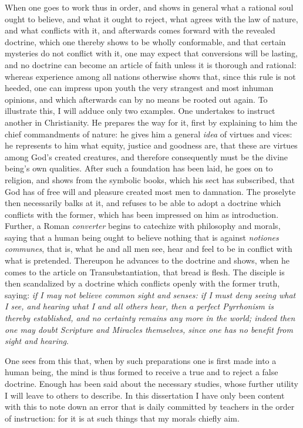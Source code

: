 \documentclass[12pt,a4paper,openany]{book}
\newcommand{\opage}[1]{\marginnote{\footnotesize\textit{[#1]}}}
\begin{document}
When one goes to work thus in order, and shows in general what a rational soul
ought to believe, and what it ought to reject, what agrees with the law of nature,
and what conflicts with it, and afterwards comes forward with the revealed
doctrine, which one thereby shows to be wholly conformable, and that certain
mysteries do not conflict with it, one may expect that conversions will be lasting,
and no doctrine can become an article of faith unless it is thorough and rational:
whereas experience among all nations otherwise shows that, since this rule is not
heeded, one can impress upon youth the very strangest and most inhuman opinions,
and which afterwards can by no means be rooted out again. To illustrate this, I
will adduce only two examples. One undertakes to instruct another in Christianity.
He prepares the way for it, first by explaining to him the chief commandments of
nature: he gives him a general \textit{idea} of virtues and vices: he represents to
him what equity, justice and goodness are, that these are virtues among God's
created creatures, and therefore consequently must be the divine being's own
qualities. After such a foundation has been laid, he goes on to religion, and
shows from the symbolic books, which his sect has subscribed, that God has
\setcounter{footnote}{0}%
\opage{20}of free will and pleasure created most men to damnation. The proselyte then
necessarily balks at it, and refuses to be able to adopt a doctrine which conflicts
with the former, which has been impressed on him as introduction. Further, a Roman
\textit{converter} begins to catechize with philosophy and morals, saying that a
human being ought to believe nothing that is against \textit{notiones communes},
that is, what he and all men see, hear and feel to be in conflict with what is
pretended. Thereupon he advances to the doctrine and shows, when he comes to the
article on Transubstantiation, that bread is flesh. The disciple is then
scandalized by a doctrine which conflicts openly with the former truth, saying:
\emph{if I may not believe common sight and senses:
if I must deny seeing what I see, and hearing what I
and all others hear, then a perfect Pyrrhonism is thereby
established, and no certainty remains any more in the world;
indeed then one may doubt Scripture and Miracles
themselves, since one has no benefit from sight and hearing}.

One sees from this that, when by such preparations one is first made into a
human being, the mind is thus formed to receive a true and to reject a false
doctrine. Enough has been said about the necessary studies, whose further
utility I will leave to others to describe. In this dissertation I have only been
content with this to note down an error that is daily committed by teachers in the
order of instruction: for it is at such things that my morals chiefly aim.
\end{document}

